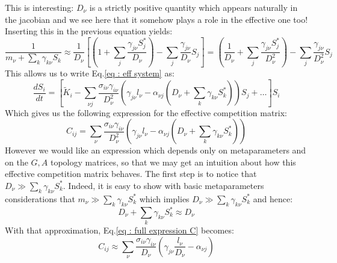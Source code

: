 \documentclass[12pt, titlepage, twoside, openright]{report}
\begin{document}
  This is interesting: $D_\nu$ is a strictly positive quantity which appears naturally in the jacobian and we see here that it somehow plays a role in the effective one too! Inserting this in the previous equation yields:
  \begin{equation}
  \frac{1}{m_\nu + \sum_k \gamma_{k\nu} S_k} \approx \frac{1}{D_\nu} \left[\left(1+\sum_j \frac{\gamma_{j\nu} S^*_j}{D_\nu}\right)-\sum_j \frac{\gamma_{j\nu}}{D_\nu}S_j\right] = \left(\frac{1}{D_\nu}+\sum_j \frac{\gamma_{j\nu} S^*_j}{D_\nu^2}\right)-\sum_j \frac{\gamma_{j\nu}}{D_\nu^2}S_j
  \end{equation}
  This allows us to write Eq.\eqref{eq : eff system} as:
  \begin{equation}
  \frac{d S_i}{dt} = \left[ \tilde{K}_i - \sum_{\nu j} \frac{\sigma_{i\nu} \gamma_{i\nu}}{D_\nu^2}\left(\gamma_{j\nu}l_\nu- \alpha_{\nu j}\left(D_\nu+\sum_k \gamma_{k \nu}S^*_k\right)\right)S_j+\dots \right] S_i
  \end{equation}
  Which gives us the following expression for the effective competition matrix:
  \begin{equation}
  C_{ij} = \sum_\nu \frac{\sigma_{i\nu} \gamma_{i\nu}}{D_\nu^2}\left(\gamma_{j\nu}l_\nu- \alpha_{\nu j}\left(D_\nu+\sum_k \gamma_{k \nu}S^*_k\right)\right) \label{eq : full expression C}
  \end{equation}
  However we would like an expression which depends only on metaparameters and on the $G, A$ topology matrices, so that we may get an intuition about how this effective competition matrix behaves. The first step is to notice that $D_\nu \gg \sum_k \gamma_{k\nu}S^*_k$. Indeed, it is easy to show with basic metaparameters considerations that $m_\nu \gg \sum_k \gamma_{k\nu} S^*_k$ which implies $D_\nu \gg \sum_k \gamma_{k\nu}S^*_k$ and hence:
  \begin{equation}
  D_\nu + \sum_k \gamma_{k\nu}S^*_k \approx D_\nu
  \end{equation}
  With that approximation, Eq.\eqref{eq : full expression C} becomes:
  \begin{equation}
  C_{ij} \approx \sum_\nu \frac{\sigma_{i\nu}\gamma_{i\nu}}{D_\nu}\left(\gamma_{j\nu}\frac{l_\nu}{D_\nu}-\alpha_{\nu j}\right) \label{eq : approx 1 C}
  \end{equation}
\end{document}

